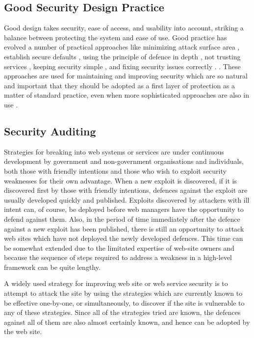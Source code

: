 \subsection{Good Security Design Practice}
Good design takes security, ease of access, and usability into account,
striking a balance between protecting the system and ease of use. Good
practice has evolved a number of practical approaches like  minimizing
attack surface area \cite{bhardwaj2018reducing},  establish secure
defaults \cite{lai2018impact}, using the principle of defence in depth
\cite{toch2018privacy}, not trusting services \cite{ghirardello2018cyber},
keeping security simple \cite{thomsen2018network}, and fixing security
issues correctly \iflonger\cite {ali2018security, tabassum2018evaluating}.
\else \cite {tabassum2018evaluating}.\fi
These approaches  are used for  maintaining and improving security which
are so natural and important that they should be adopted as a first
layer of protection as a matter of standard practice, even when more
sophisticated approaches are also in use \cite {ross2018systems}.


\subsection{Security Auditing}\label{audit}

Strategies for breaking into web systems or services are under continuous
development by government and non-government organisations and individuals,
both those with friendly intentions and those who wish to exploit security
weaknesses for their own advantage. When
a new exploit is discovered, if it is discovered first by those with 
friendly intentions, defences against the exploit are usually developed
quickly and published. Exploits discovered by attackers with ill intent
can, of course, be deployed before web managers have the opportunity
to defend against them. Also, in the period of time immediately after
the defence against a new exploit has been published, there is still
an opportunity to attack web sites which have not deployed the newly developed
defences. This time can be somewhat extended due to the limitated expertise
of web-site owners and because the sequence of steps required to address a weakness
in a high-level framework can be quite lengthy.

A widely used strategy for improving web site or web service security is
to attempt to attack the site by using the strategies which are currently
known to be effective one-by-one, or simultaneously, to discover if the
site is vulnerable to any of these strategies. Since all of the strategies
tried are known, the defences against all of them are also almost certainly
known, and hence can be adopted by the web site.

